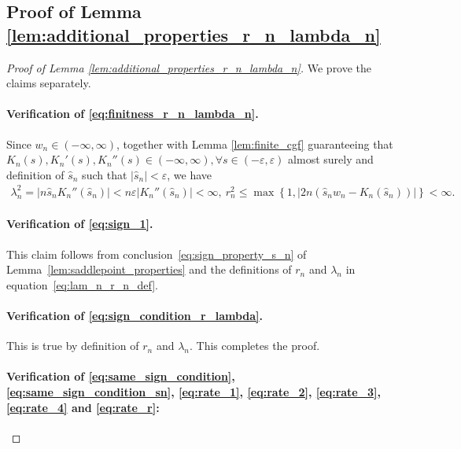 \documentclass[12pt]{article}
\theoremstyle{definition}
\begin{document}
\subsection{Proof of Lemma \ref{lem:additional_properties_r_n_lambda_n}}

\begin{proof}[Proof of Lemma \ref{lem:additional_properties_r_n_lambda_n}]
We prove the claims separately.

\paragraph{Verification of \eqref{eq:finitness_r_n_lambda_n}.}

Since $w_n\in (-\infty,\infty)$, together with Lemma \ref{lem:finite_cgf} guaranteeing that $K_n(s),K_n'(s),K_n''(s)\in (-\infty,\infty),\forall s\in (-\varepsilon,\varepsilon)$ almost surely and definition of $\hat s_n$ such that $|\hat s_n|<\varepsilon$, we have 
\begin{align*}
	\lambda_n^2=|n\hat s_n K_n''(\hat s_n)|<n\varepsilon|K_n''(\hat s_n)|<\infty,\ r_n^2\leq \max\left\{1,|2n(\hat s_n w_n-K_n(\hat s_n))|\right\}<\infty.
\end{align*}

\paragraph{Verification of \eqref{eq:sign_1}.} This claim follows from conclusion~\eqref{eq:sign_property_s_n} of Lemma~\ref{lem:saddlepoint_properties} and the definitions of $r_n$ and $\lambda_n$ in equation~\eqref{eq:lam_n_r_n_def}.

\paragraph{Verification of \eqref{eq:sign_condition_r_lambda}.}

This is true by definition of $r_n$ and $\lambda_n$. This completes the proof.

\paragraph{Verification of \eqref{eq:same_sign_condition}, \eqref{eq:same_sign_condition_sn}, \eqref{eq:rate_1}, \eqref{eq:rate_2}, \eqref{eq:rate_3}, \eqref{eq:rate_4} and \eqref{eq:rate_r}:}


\end{proof}
\end{document}
